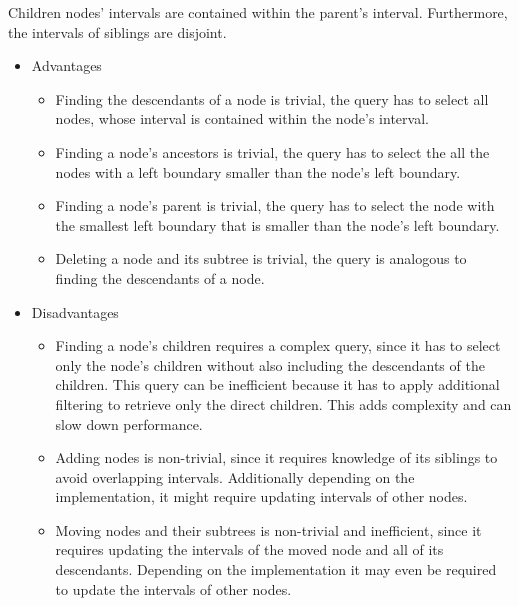 \begin{itemize}[nolistsep]
	      Children nodes' intervals are contained within the parent's interval. Furthermore, the
	      intervals of siblings are disjoint.
	      \begin{itemize}
		      \item Advantages
		            \begin{itemize}
			            \item Finding the descendants of a node is trivial, the query has to select all
			                  nodes, whose interval is contained within the node's interval.
			            \item Finding a node's ancestors is trivial, the query has to select the all the
			                  nodes with a left boundary smaller than the node's left boundary.
			            \item Finding a node's parent is trivial, the query has to select the node with
			                  the smallest left boundary that is smaller than the node's left boundary.
			            \item Deleting a node and its subtree is trivial, the query is analogous to finding
			                  the descendants of a node.
		            \end{itemize}
		      \item Disadvantages
		            \begin{itemize}
			            \item Finding a node's children requires a complex query, since it has to select
			                  only the node's children without also including the descendants of the
			                  children. This query can be inefficient because it has to apply additional filtering
			                  to retrieve only the direct children. This adds complexity and can slow down
			                  performance.
			            \item Adding nodes is non-trivial, since it requires knowledge of its siblings to
			                  avoid overlapping intervals. Additionally depending on the implementation, it
			                  might require updating intervals of other nodes.
			            \item Moving nodes and their subtrees is non-trivial and inefficient, since it requires updating
			                  the intervals of the moved node and all of its descendants.
			                  Depending on the implementation it may even be required to update the intervals of
			                  other nodes.
		            \end{itemize}

\end{itemize}
\end{itemize}
